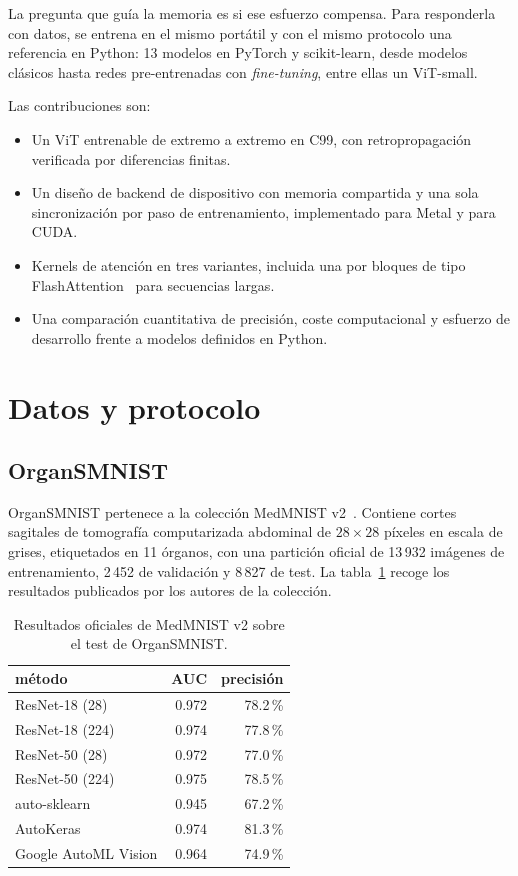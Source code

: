 \documentclass[11pt,a4paper]{article}
\begin{document}
La pregunta que guía la memoria es si ese esfuerzo compensa. Para responderla
con datos, se entrena en el mismo portátil y con el mismo protocolo una
referencia en Python: 13 modelos en PyTorch y scikit-learn, desde modelos
clásicos hasta redes pre-entrenadas con \emph{fine-tuning}, entre ellas un
ViT-small.

Las contribuciones son:

\begin{itemize}
  \item Un ViT entrenable de extremo a extremo en C99, con retropropagación
        verificada por diferencias finitas.
  \item Un diseño de backend de dispositivo con memoria compartida y una sola
        sincronización por paso de entrenamiento, implementado para Metal y
        para CUDA.
  \item Kernels de atención en tres variantes, incluida una por bloques de tipo
        FlashAttention~\cite{flashattention} para secuencias largas.
  \item Una comparación cuantitativa de precisión, coste computacional y
        esfuerzo de desarrollo frente a modelos definidos en Python.
\end{itemize}

\section{Datos y protocolo}

\subsection{OrganSMNIST}

OrganSMNIST pertenece a la colección MedMNIST v2~\cite{medmnistv2}. Contiene
cortes sagitales de tomografía computarizada abdominal de $28\times28$ píxeles
en escala de grises, etiquetados en 11 órganos, con una partición oficial de
13\,932 imágenes de entrenamiento, 2\,452 de validación y 8\,827 de test. La
tabla~\ref{tab:oficial} recoge los resultados publicados por los autores de la
colección.

\begin{table}[H]
  \centering\small
  \begin{tabular}{lrr}
    \toprule
    método & AUC & precisión \\
    \midrule
    ResNet-18 (28)       & 0.972 & 78.2\,\% \\
    ResNet-18 (224)      & 0.974 & 77.8\,\% \\
    ResNet-50 (28)       & 0.972 & 77.0\,\% \\
    ResNet-50 (224)      & 0.975 & 78.5\,\% \\
    auto-sklearn         & 0.945 & 67.2\,\% \\
    AutoKeras            & 0.974 & 81.3\,\% \\
    Google AutoML Vision & 0.964 & 74.9\,\% \\
    \bottomrule
  \end{tabular}
  \caption{Resultados oficiales de MedMNIST v2 sobre el test de OrganSMNIST.}
  \label{tab:oficial}
\end{table}
\end{document}
